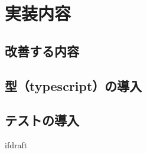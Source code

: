 \documentclass{jsarticle}
\begin{document}
    \fi
    \section{実装内容}
    \subsection{改善する内容}
    \subsection{型（typescript）の導入}
    \subsection{テストの導入}

    \expandafter\ifx\csname ifdraft\endcsname\relax
\end{document}
